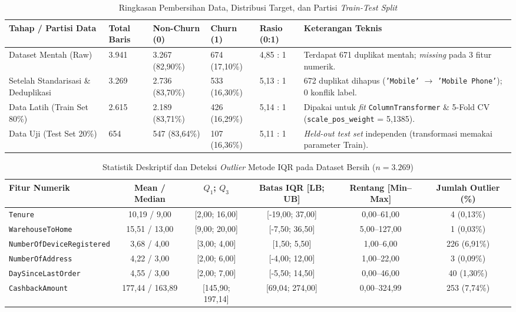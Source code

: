 \documentclass[11pt,a4paper]{article}
\DeclareRobustCommand{\code}[1]{\texttt{\textcolor{CodeColor}{#1}}}
\newcommand{\thdr}[1]{\textbf{#1}}
\begin{document}
\begin{table}[H]
  \centering
  \caption{Ringkasan Pembersihan Data, Distribusi Target, dan Partisi \textit{Train-Test Split}}
  \label{tab:partisi}
  \renewcommand{\arraystretch}{1.25}
  \setlength{\tabcolsep}{3.5pt}
  \scriptsize
  \begin{tabularx}{\textwidth}{@{}P{2.5cm} M{1.1cm} M{2.0cm} M{1.9cm} M{1.3cm} L@{}}
    \toprule
    \thdr{Tahap / Partisi Data} & \thdr{Total Baris} & \thdr{Non-Churn (0)} & \thdr{Churn (1)} & \thdr{Rasio (0:1)} & \thdr{Keterangan Teknis} \\
    \midrule
    Dataset Mentah (Raw) & 3.941 & 3.267 (82,90\%) & 674 (17,10\%) & 4,85 : 1 & Terdapat 671 duplikat mentah; \textit{missing} pada 3 fitur numerik. \\
    Setelah Standarisasi \& Deduplikasi & 3.269 & 2.736 (83,70\%) & 533 (16,30\%) & 5,13 : 1 & 672 duplikat dihapus (\code{'Mobile'} $\rightarrow$ \code{'Mobile Phone'}); 0 konflik label. \\
    Data Latih (Train Set 80\%) & 2.615 & 2.189 (83,71\%) & 426 (16,29\%) & 5,14 : 1 & Dipakai untuk \textit{fit} \code{ColumnTransformer} \& 5-Fold CV (\code{scale\_pos\_weight} = 5,1385). \\
    Data Uji (Test Set 20\%) & 654 & 547 (83,64\%) & 107 (16,36\%) & 5,11 : 1 & \textit{Held-out test set} independen (transformasi memakai parameter Train). \\
    \bottomrule
  \end{tabularx}
\end{table}

\begin{table}[H]
  \centering
  \caption{Statistik Deskriptif dan Deteksi \textit{Outlier} Metode IQR pada Dataset Bersih ($n = 3.269$)}
  \label{tab:iqr}
  \renewcommand{\arraystretch}{1.24}
  \setlength{\tabcolsep}{3.5pt}
  \scriptsize
  \begin{tabularx}{\textwidth}{@{}P{3.6cm} C C C C C@{}}
    \toprule
    \thdr{Fitur Numerik} & \thdr{Mean / Median} & \thdr{$Q_1$; $Q_3$} & \thdr{Batas IQR [LB; UB]} & \thdr{Rentang [Min--Max]} & \thdr{Jumlah Outlier (\%)} \\
    \midrule
    \code{Tenure} & 10,19 / 9,00 & [2,00; 16,00] & [-19,00; 37,00] & 0,00--61,00 & 4 (0,13\%) \\
    \code{WarehouseToHome} & 15,51 / 13,00 & [9,00; 20,00] & [-7,50; 36,50] & 5,00--127,00 & 1 (0,03\%) \\
    \code{NumberOfDeviceRegistered} & 3,68 / 4,00 & [3,00; 4,00] & [1,50; 5,50] & 1,00--6,00 & 226 (6,91\%) \\
    \code{NumberOfAddress} & 4,22 / 3,00 & [2,00; 6,00] & [-4,00; 12,00] & 1,00--22,00 & 3 (0,09\%) \\
    \code{DaySinceLastOrder} & 4,55 / 3,00 & [2,00; 7,00] & [-5,50; 14,50] & 0,00--46,00 & 40 (1,30\%) \\
    \code{CashbackAmount} & 177,44 / 163,89 & [145,90; 197,14] & [69,04; 274,00] & 0,00--324,99 & 253 (7,74\%) \\
    \bottomrule
  \end{tabularx}
\end{table}
\end{document}
